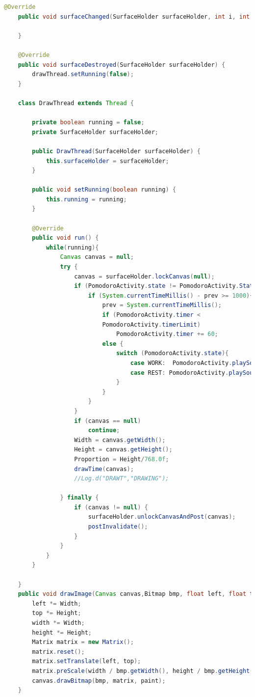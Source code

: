 \documentclass[12pt]{article}
\begin{document}
\begin{lstlisting}[language=java, caption={Fisierul TimeControl.java}, label=list2]
    @Override
    public void surfaceChanged(SurfaceHolder surfaceHolder, int i, int i1, int i2) {

    }

    @Override
    public void surfaceDestroyed(SurfaceHolder surfaceHolder) {
        drawThread.setRunning(false);
    }

    class DrawThread extends Thread {

        private boolean running = false;
        private SurfaceHolder surfaceHolder;

        public DrawThread(SurfaceHolder surfaceHolder) {
            this.surfaceHolder = surfaceHolder;
        }

        public void setRunning(boolean running) {
            this.running = running;
        }

        @Override
        public void run() {
            while(running){
                Canvas canvas = null;
                try {
                    canvas = surfaceHolder.lockCanvas(null);
                    if (PomodoroActivity.state != PomodoroActivity.State.NONE &&  PomodoroActivity.state != PomodoroActivity.State.PAUSE) {
                        if (System.currentTimeMillis() - prev >= 1000){
                            prev = System.currentTimeMillis();
                            if (PomodoroActivity.timer < 
                            PomodoroActivity.timerLimit)
                                PomodoroActivity.timer += 60;
                            else {
                                switch (PomodoroActivity.state){
                                    case WORK:  PomodoroActivity.playSound(); PomodoroActivity.startRest(); break;
                                    case REST: PomodoroActivity.playSound(); PomodoroActivity.startWork(); break;
                                }
                            }
                        }
                    }
                    if (canvas == null)
                        continue;
                    Width = canvas.getWidth();
                    Height = canvas.getHeight();
                    Proportion = Height/768.0f;
                    drawTime(canvas);
                    //Log.d("DRAWT","DRAWING");

                } finally {
                    if (canvas != null) {
                        surfaceHolder.unlockCanvasAndPost(canvas);
                        postInvalidate();
                    }
                }
            }
        }

    }
    public void drawImage(Canvas canvas,Bitmap bmp, float left, float top,float width, float height, Paint paint){
        left *= Width;
        top *= Height;
        width *= Width;
        height *= Height;
        Matrix matrix = new Matrix();
        matrix.reset();
        matrix.setTranslate(left, top);
        matrix.preScale(width / bmp.getWidth(), height / bmp.getHeight());
        canvas.drawBitmap(bmp, matrix, paint);
    }


\end{lstlisting}
\end{document}
